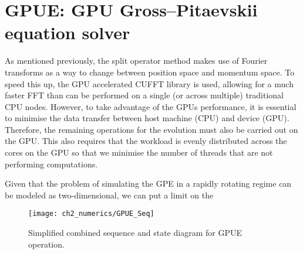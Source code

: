 \section{GPUE: GPU Gross--Pitaevskii equation solver}

As mentioned previously, the split operator method makes use of Fourier transforms as a way to change between position space and momentum space. To speed this up, the GPU accelerated CUFFT library is used, allowing for a much faster FFT than can be performed on a single (or across multiple) traditional CPU nodes. However, to take advantage of the GPUs performance, it is essential to minimise the data transfer between host machine (CPU) and device (GPU). Therefore, the remaining operations for the evolution must also be carried out on the GPU. This also requires that the workload is evenly distributed across the cores on the GPU so that we minimise the number of threads that are not performing computations.

Given that the problem of simulating the GPE in a rapidly rotating regime can be modeled as two-dimensional, we can put a limit on the


\begin{figure}
    \texttt{[image: ch2\_numerics/GPUE\_Seq]}
    \caption{Simplified combined sequence and state diagram for GPUE operation.}
    \label{fig:gpue_seq}
\end{figure}
